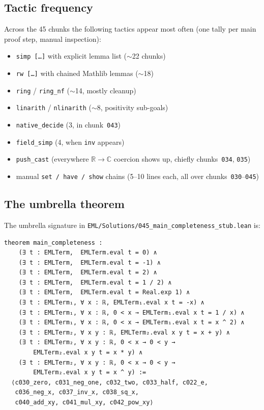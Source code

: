 \documentclass[11pt,a4paper]{article}
\theoremstyle{plain}
\theoremstyle{definition}
\newcommand{\R}{\mathbb{R}}
\newcommand{\C}{\mathbb{C}}
\begin{document}
\subsection{Tactic frequency}

Across the 45 chunks the following tactics appear most often (one tally
per main proof step, manual inspection):

\begin{itemize}[leftmargin=*,nosep]
\item \texttt{simp [\ldots]} with explicit lemma list ($\sim$22 chunks)
\item \texttt{rw [\ldots]} with chained Mathlib lemmas ($\sim$18)
\item \texttt{ring} / \texttt{ring\_nf} ($\sim$14, mostly cleanup)
\item \texttt{linarith} / \texttt{nlinarith} ($\sim$8, positivity
sub-goals)
\item \texttt{native\_decide} (3, in chunk~\texttt{043})
\item \texttt{field\_simp} (4, when \texttt{inv} appears)
\item \texttt{push\_cast} (everywhere $\R\to\C$ coercion shows up,
chiefly chunks~\texttt{034}, \texttt{035})
\item manual \texttt{set / have / show} chains (5--10 lines each,
all over chunks~\texttt{030}--\texttt{045})
\end{itemize}

\subsection{The umbrella theorem}\label{sec:umbrella}

The umbrella signature in
\texttt{EML/Solutions/045\_main\_completeness\_stub.lean} is:

\begin{lstlisting}
theorem main_completeness :
    (∃ t : EMLTerm,  EMLTerm.eval t = 0) ∧
    (∃ t : EMLTerm,  EMLTerm.eval t = -1) ∧
    (∃ t : EMLTerm,  EMLTerm.eval t = 2) ∧
    (∃ t : EMLTerm,  EMLTerm.eval t = 1 / 2) ∧
    (∃ t : EMLTerm,  EMLTerm.eval t = Real.exp 1) ∧
    (∃ t : EMLTerm₁, ∀ x : ℝ, EMLTerm₁.eval x t = -x) ∧
    (∃ t : EMLTerm₁, ∀ x : ℝ, 0 < x → EMLTerm₁.eval x t = 1 / x) ∧
    (∃ t : EMLTerm₁, ∀ x : ℝ, 0 < x → EMLTerm₁.eval x t = x ^ 2) ∧
    (∃ t : EMLTerm₂, ∀ x y : ℝ, EMLTerm₂.eval x y t = x + y) ∧
    (∃ t : EMLTerm₂, ∀ x y : ℝ, 0 < x → 0 < y →
        EMLTerm₂.eval x y t = x * y) ∧
    (∃ t : EMLTerm₂, ∀ x y : ℝ, 0 < x → 0 < y →
        EMLTerm₂.eval x y t = x ^ y) :=
  ⟨c030_zero, c031_neg_one, c032_two, c033_half, c022_e,
   c036_neg_x, c037_inv_x, c038_sq_x,
   c040_add_xy, c041_mul_xy, c042_pow_xy⟩
\end{lstlisting}
\end{document}
